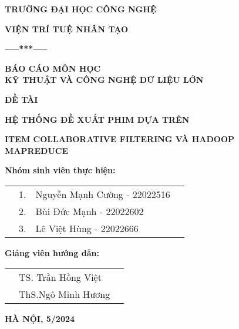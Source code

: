 \begin{center}
    \LARGE
    \textbf{TRƯỜNG ĐẠI HỌC CÔNG NGHỆ}

    \vspace{0.5cm}
    \Large
    \textbf{VIỆN TRÍ TUỆ NHÂN TẠO}

    \vspace{0.5cm}
    \Large
    \textbf{-----***-----}

    \vspace{2.5cm}
    \textbf{BÁO CÁO MÔN HỌC}\\
    \textbf{KỸ THUẬT VÀ CÔNG NGHỆ DỮ LIỆU LỚN}

    \vspace{0.5cm}
    \textbf{ĐỀ TÀI}

    \vspace{0.5cm}
    \centerline{\textbf{HỆ THỐNG ĐỀ XUẤT PHIM DỰA TRÊN}}
    \centerline{\textbf{ITEM COLLABORATIVE FILTERING VÀ HADOOP MAPREDUCE}}

    \vspace{2cm}
    \textbf{Nhóm sinh viên thực hiện:} \\

    \vspace{0.2cm}
    \begin{tabular}{p{8cm}lll}
         & 1. & Nguyễn Mạnh Cường - 22022516 \\
         & 2. & Bùi Đức Mạnh - 22022602      \\
         & 3. & Lê Việt Hùng - 22022666      \\
    \end{tabular}

    \vspace{0.5cm}
    \textbf{Giảng viên hướng dẫn:} \\
    \vspace{0.2cm}
    \begin{tabular}{p{6cm}ll}
         & TS. Trần Hồng Việt \\
         & ThS.Ngô Minh Hương \\
    \end{tabular}

    \vfill

    \textbf{HÀ NỘI, 5/2024}


\end{center}

